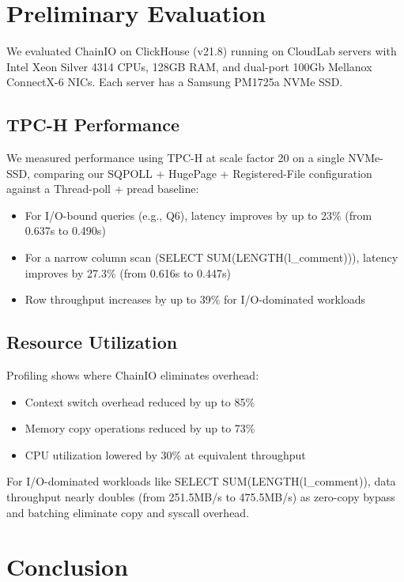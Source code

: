 \documentclass[sigconf,10pt]{acmart}
\newcommand{\sys}{ChainIO\xspace}
\begin{document}
\section{Preliminary Evaluation}\label{sec:evaluation}

We evaluated \sys on ClickHouse (v21.8) running on CloudLab servers with Intel Xeon Silver 4314 CPUs, 128GB RAM, and dual-port 100Gb Mellanox ConnectX-6 NICs. Each server has a Samsung PM1725a NVMe SSD.

\subsection{TPC-H Performance}

We measured performance using TPC-H at scale factor 20 on a single NVMe-SSD, comparing our SQPOLL + HugePage + Registered-File configuration against a Thread-poll + pread baseline:

\begin{itemize}[leftmargin=*,itemsep=0pt]
  \item For I/O-bound queries (e.g., Q6), latency improves by up to 23\% (from 0.637s to 0.490s)
  \item For a narrow column scan (SELECT SUM(LENGTH(l\_comment))), latency improves by 27.3\% (from 0.616s to 0.447s)
  \item Row throughput increases by up to 39\% for I/O-dominated workloads
\end{itemize}

\subsection{Resource Utilization}

Profiling shows where \sys eliminates overhead:

\begin{itemize}[leftmargin=*,itemsep=0pt]
  \item Context switch overhead reduced by up to 85\%
  \item Memory copy operations reduced by up to 73\%
  \item CPU utilization lowered by 30\% at equivalent throughput
\end{itemize}

For I/O-dominated workloads like SELECT SUM(LENGTH(l\_comment)), data throughput nearly doubles (from 251.5MB/s to 475.5MB/s) as zero-copy bypass and batching eliminate copy and syscall overhead.

\section{Conclusion}
\end{document}
